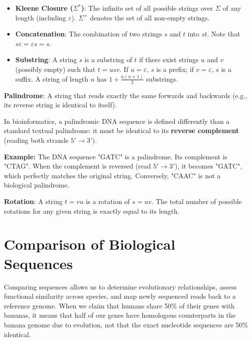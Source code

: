 \documentclass[11pt,a4paper]{article}
\newcommand{\sta}{\textbf{\textcolor{red}{\sffamily\upshape [!]}} }
\begin{document}
\begin{itemize}
    \item \textbf{Kleene Closure (\(\Sigma^*\))}: The infinite set of all possible strings over \(\Sigma\) of any length (including \(\varepsilon\)). \(\Sigma^+\) denotes the set of all non-empty strings.
    \item \textbf{Concatenation}: The combination of two strings \(s\) and \(t\) into \(st\). Note that \(s\varepsilon = \varepsilon s = s\).
    \item \textbf{Substring}: A string \(s\) is a substring of \(t\) if there exist strings \(u\) and \(v\) (possibly empty) such that \(t = usv\). If \(u = \varepsilon\), \(s\) is a prefix; if \(v = \varepsilon\), \(s\) is a suffix. A string of length \(n\) has \(1 + \frac{n(n+1)}{2}\) substrings.
\end{itemize}

\begin{important}
\textbf{Palindrome}: A string that reads exactly the same forwards and backwards (e.g., its reverse string is identical to itself). 
\end{important}

\sta In bioinformatics, a palindromic DNA sequence is defined differently than a standard textual palindrome: it must be identical to its \textbf{reverse complement} (reading both strands \(5' \rightarrow 3'\)). 

\textbf{Example:} 
The DNA sequence "GATC" is a palindrome. 
Its complement is "CTAG". When the complement is reversed (read \(5' \rightarrow 3'\)), it becomes "GATC", which perfectly matches the original string. Conversely, "CAAC" is not a biological palindrome.

\begin{important}
\textbf{Rotation}: A string \(t = vu\) is a rotation of \(s = uv\). The total number of possible rotations for any given string is exactly equal to its length.
\end{important}

\section{Comparison of Biological Sequences}

Comparing sequences allows us to determine evolutionary relationships, assess functional similarity across species, and map newly sequenced reads back to a reference genome. When we claim that humans share 50\% of their genes with bananas, it means that half of our genes have homologous counterparts in the banana genome due to evolution, not that the exact nucleotide sequences are 50\% identical.
\end{document}
